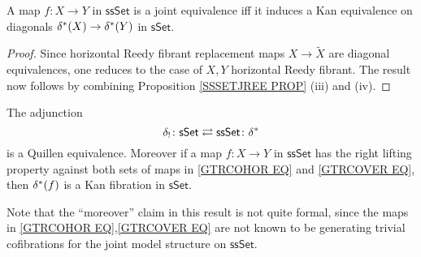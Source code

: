 \documentclass[a4paper,10pt
,draft
]{article}%
\begin{document}
\begin{corollary}\label{WEAKDIAG COR}
	A map $f\colon X \to Y$ in $\mathsf{ssSet}$ is a joint equivalence iff it induces a Kan equivalence on diagonals
	$\delta^{\**}(X) \to \delta^{\**}(Y)$ in $\mathsf{sSet}$.
\end{corollary}

\begin{proof}
	Since horizontal Reedy fibrant replacement maps
	$X \to \tilde{X}$ are diagonal equivalences, 
	one reduces to the case of $X,Y$ horizontal Reedy fibrant. The result now follows by combining
	Proposition \ref{SSSETJREE PROP} (iii) and (iv). \end{proof}


\begin{corollary}\label{SSETSSETADJ COR}
	The adjunction
\[
	\delta_{!}\colon \mathsf{sSet} 
		\rightleftarrows 
	\mathsf{ssSet} \colon \delta^{\**}
\]
is a Quillen equivalence.
Moreover if a map $f\colon X \to Y$ in $\mathsf{ssSet}$ has the right lifting property
against both sets of maps in
\eqref{GTRCOHOR EQ} and \eqref{GTRCOVER EQ}, then
$\delta^{\**} (f)$ is a Kan fibration in $\mathsf{sSet}$.
\end{corollary}

Note that the ``moreover'' claim in this result is not quite formal, since the maps in \eqref{GTRCOHOR EQ},\eqref{GTRCOVER EQ} are not known to be generating trivial cofibrations for the joint model structure on $\mathsf{ssSet}$.
\end{document}
